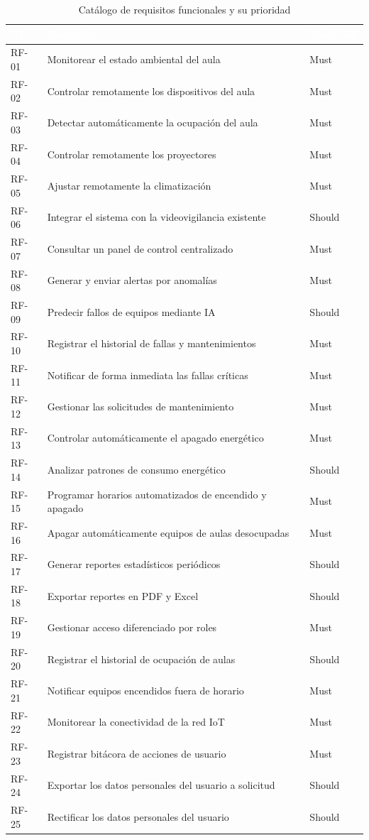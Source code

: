 \begin{table}[H]
\centering
\small
\begin{tabular}{|l|p{9.3cm}|l|}
\hline
\cellcolor{sigagreen}\textcolor{white}{\textbf{ID}} & \cellcolor{sigagreen}\textcolor{white}{\textbf{Requisito}} & \cellcolor{sigagreen}\textcolor{white}{\textbf{MoSCoW}} \\ \hline
RF-01 & Monitorear el estado ambiental del aula & Must \\ \hline
RF-02 & Controlar remotamente los dispositivos del aula & Must \\ \hline
RF-03 & Detectar autom\'aticamente la ocupaci\'on del aula & Must \\ \hline
RF-04 & Controlar remotamente los proyectores & Must \\ \hline
RF-05 & Ajustar remotamente la climatizaci\'on & Must \\ \hline
RF-06 & Integrar el sistema con la videovigilancia existente & Should \\ \hline
RF-07 & Consultar un panel de control centralizado & Must \\ \hline
RF-08 & Generar y enviar alertas por anomal\'ias & Must \\ \hline
RF-09 & Predecir fallos de equipos mediante IA & Should \\ \hline
RF-10 & Registrar el historial de fallas y mantenimientos & Must \\ \hline
RF-11 & Notificar de forma inmediata las fallas cr\'iticas & Must \\ \hline
RF-12 & Gestionar las solicitudes de mantenimiento & Must \\ \hline
RF-13 & Controlar autom\'aticamente el apagado energ\'etico & Must \\ \hline
RF-14 & Analizar patrones de consumo energ\'etico & Should \\ \hline
RF-15 & Programar horarios automatizados de encendido y apagado & Must \\ \hline
RF-16 & Apagar autom\'aticamente equipos de aulas desocupadas & Must \\ \hline
RF-17 & Generar reportes estad\'isticos peri\'odicos & Should \\ \hline
RF-18 & Exportar reportes en PDF y Excel & Should \\ \hline
RF-19 & Gestionar acceso diferenciado por roles & Must \\ \hline
RF-20 & Registrar el historial de ocupaci\'on de aulas & Should \\ \hline
RF-21 & Notificar equipos encendidos fuera de horario & Must \\ \hline
RF-22 & Monitorear la conectividad de la red IoT & Must \\ \hline
RF-23 & Registrar bit\'acora de acciones de usuario & Must \\ \hline
RF-24 & Exportar los datos personales del usuario a solicitud & Should \\ \hline
RF-25 & Rectificar los datos personales del usuario & Should \\ \hline
\end{tabular}
\caption{Cat\'alogo de requisitos funcionales y su prioridad}
\label{tab:catalogo-rf}
\end{table}

